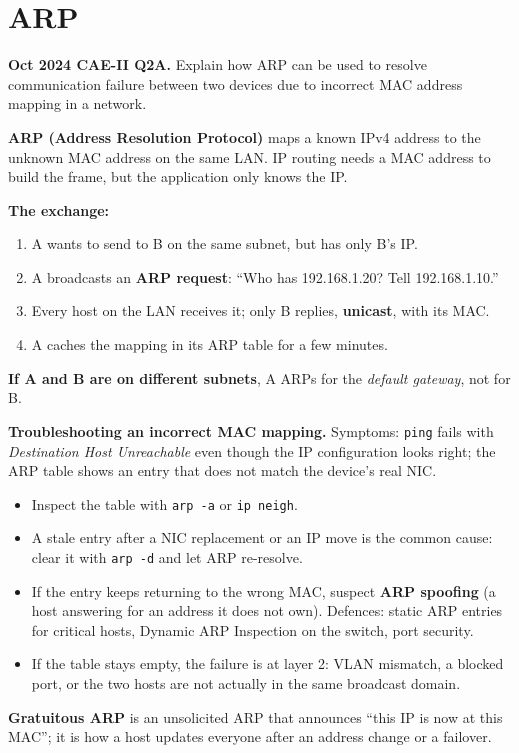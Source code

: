 \documentclass[11pt,a4paper]{article}
\begin{document}
\section{ARP}

\begin{pyqbox}
\textbf{Oct 2024 CAE-II Q2A.} Explain how ARP can be used to resolve communication failure between two devices due to incorrect MAC address mapping in a network.
\end{pyqbox}

\begin{solbox}
\textbf{ARP (Address Resolution Protocol)} maps a known IPv4 address to the unknown MAC address on the same LAN. IP routing needs a MAC address to build the frame, but the application only knows the IP.

\textbf{The exchange:}
\begin{enumerate}
\item A wants to send to B on the same subnet, but has only B's IP.
\item A broadcasts an \textbf{ARP request}: ``Who has 192.168.1.20? Tell 192.168.1.10.''
\item Every host on the LAN receives it; only B replies, \textbf{unicast}, with its MAC.
\item A caches the mapping in its ARP table for a few minutes.
\end{enumerate}

\textbf{If A and B are on different subnets}, A ARPs for the \emph{default gateway}, not for B.

\textbf{Troubleshooting an incorrect MAC mapping.} Symptoms: \texttt{ping} fails with \emph{Destination Host Unreachable} even though the IP configuration looks right; the ARP table shows an entry that does not match the device's real NIC.
\begin{itemize}
\item Inspect the table with \texttt{arp -a} or \texttt{ip neigh}.
\item A stale entry after a NIC replacement or an IP move is the common cause: clear it with \texttt{arp -d} and let ARP re-resolve.
\item If the entry keeps returning to the wrong MAC, suspect \textbf{ARP spoofing} (a host answering for an address it does not own). Defences: static ARP entries for critical hosts, Dynamic ARP Inspection on the switch, port security.
\item If the table stays empty, the failure is at layer 2: VLAN mismatch, a blocked port, or the two hosts are not actually in the same broadcast domain.
\end{itemize}

\textbf{Gratuitous ARP} is an unsolicited ARP that announces ``this IP is now at this MAC''; it is how a host updates everyone after an address change or a failover.
\end{solbox}
\end{document}

